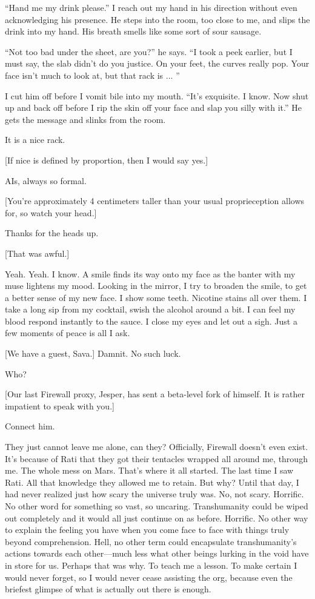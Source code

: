 ``Hand me my drink please.'' I reach out my hand in his direction without even acknowledging his presence. He steps into the room, too close to me, and slips the drink into my hand. His breath smells like some sort of sour sausage. 

``Not too bad under the sheet, are you?'' he says. ``I took a peek earlier, but I must say, the slab didn't do you justice. On your feet, the curves really pop. Your face isn't much to look at, but that rack is ... '' 

I cut him off before I vomit bile into my mouth. ``It's exquisite. I know. Now shut up and back off before I rip the skin off your face and slap you silly with it.'' He gets the message and slinks from the room. 

It is a nice rack. 

[If nice is defined by proportion, then I would say yes.] 

AIs, always so formal. 

[You're approximately 4 centimeters taller than your usual proprieception allows for, so watch your head.] 

Thanks for the heads up. 

[That was awful.] 

Yeah. Yeah. I know. A smile finds its way onto my face as the banter with my muse lightens my mood. Looking in the mirror, I try to broaden the smile, to get a better sense of my new face. I show some teeth. Nicotine stains all over them. I take a long sip from my cocktail, swish the alcohol around a bit. I can feel my blood respond instantly to the sauce. I close my eyes and let out a sigh. Just a few moments of peace is all I ask. 

[We have a guest, Sava.] Damnit. No such luck. 

Who? 

[Our last Firewall proxy, Jesper, has sent a beta-level fork of himself. It is rather impatient to speak with you.] 

Connect him. 

They just cannot leave me alone, can they? Officially, Firewall doesn't even exist. It's because of Rati that they got their tentacles wrapped all around me, through me. The whole mess on Mars. That's where it all started. The last time I saw Rati. All that knowledge they allowed me to retain. But why? Until that day, I had never realized just how scary the universe truly was. No, not scary. Horrific. No other word for something so vast, so uncaring. Transhumanity could be wiped out completely and it would all just continue on as before. Horrific. No other way to explain the feeling you have when you come face to face with things truly beyond comprehension. Hell, no other term could encapsulate transhumanity's actions towards each other—much less what other beings lurking in the void have in store for us. Perhaps that was why. To teach me a lesson. To make certain I would never forget, so I would never cease assisting the org, because even the briefest glimpse of what is actually out there is enough. 

